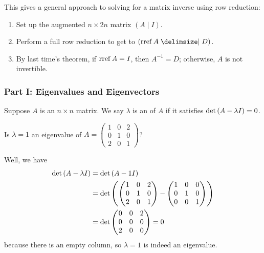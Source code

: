 \documentclass[main.tex]{subfiles}
\begin{document}
This gives a general approach to solving for a matrix inverse using row reduction:
\begin{enumerate}
    \item Set up the augmented $n\times 2n$ matrix $(A \mid I)$.
    \item Perform a full row reduction to get to $(\rref A \mid D)$.
    \item By last time's theorem, if $\operatorname{rref} A = I$, then $A^{-1} = D$; otherwise, $A$ is not invertible.
\end{enumerate}

\subsubsection{Part I: Eigenvalues and Eigenvectors}

\begin{definition}
    Suppose $A$ is an $n\times n$ matrix. We say $\lambda$ is an  of $A$ if it satisfies $\det \left( A - \lambda I \right) = 0$.
\end{definition}

\begin{example}
    Is $\lambda = 1$ an eigenvalue of $A = \begin{pmatrix}
        1 & 0 & 2 \\
        0 & 1 & 0 \\
        2 & 0 & 1
    \end{pmatrix}$?
\end{example}

Well, we have
\begin{align*}
    \det \left( A - \lambda I \right) &= \det \left( A - 1I \right) \\
    &= \det \left( \begin{pmatrix}
        1 & 0 & 2 \\
        0 & 1 & 0 \\
        2 & 0 & 1
    \end{pmatrix} - \begin{pmatrix}
        1 & 0 & 0 \\
        0 & 1 & 0 \\
        0 & 0 & 1
    \end{pmatrix} \right) \\
    &= \det\begin{pmatrix}
        0 & 0 & 2 \\
        0 & 0 & 0 \\
        2 & 0 & 0
    \end{pmatrix} = 0
\end{align*}
because there is an empty column, so $\lambda = 1$ is indeed an eigenvalue.
\end{document}
